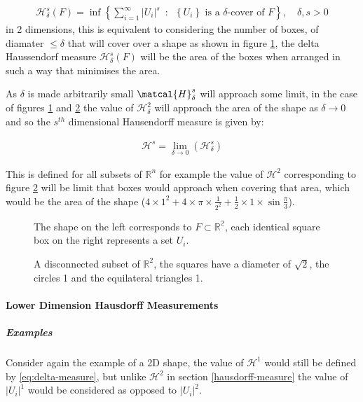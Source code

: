 \documentclass[11pt]{article}
\begin{document}
\begin{align}
\mathcal{H}^s_{\delta}\left( F \right)= \inf \left\{ \sum^{\infty}_{i= 1}   \left\lvert U_i \right\rvert^s \enspace : \enspace  \left\{U_i\right\} \text{ is a } \delta \text{-cover of } F \right\}, \quad \delta, s > 0 \label{eq:delta-measure}
\end{align}
in 2 dimensions, this is equivalent to considering the number of boxes, of
diamater \(\leq \delta\) that will cover over a shape as shown in figure
\ref{hausdorff-covering}, the delta Haussendorf measure
\(\mathcal{H}^{s}_{\delta} \left(F\right)\) will be the area of the boxes when
arranged in such a way that minimises the area.

As \(\delta\) is made arbitrarily small \(\matcal{H}_{\delta}^{s}\) will approach some limit, in the case of figures \ref{hausdorff-covering}  and \ref{abstract-shape} the value of \(\mathcal{H}^{2}_{\delta}\) will approach the area of the shape as \(\delta \rightarrow 0\) and so the \(s^{th}\) dimensional Hausendorff measure is given by:

\begin{align}
\mathcal{H}^{s} = \lim_{\delta \rightarrow 0}\left( \mathcal{H}^{s}_{\delta} \right)
\end{align}

This is defined for all subsets of \(\mathbb{R}^n\) for example the value of  \(\mathcal{H}^{2}\) corresponding to figure \ref{abstract-shape} will be limit that boxes would approach when covering that area, which would be the area of the shape (\(4\times 1^2 + 4\times \pi\times \frac{1}{2^2} + \frac{1}{2}\times 1 \times \sin{\frac{\pi}{3}}\)).



\begin{figure}[htbp]
\centering

\caption{\label{hausdorff-covering}The shape on the left corresponds to \(F \subset \mathbb{R^{2}}\), each identical square box on the right represents a set \(U_{i}\).}
\end{figure}


\begin{figure}[htbp]
\centering

\caption{\label{abstract-shape}A disconnected subset of \(\mathbb{R}^{2}\), the squares have a diameter of \(\sqrt{2}\), the circles 1 and the equilateral triangles 1.}
\end{figure}

\paragraph{Lower Dimension Hausdorff Measurements}
\label{sec:orga66b4dd}
\subparagraph{Examples}
\label{sec:orgfb17928}
Consider again the example of a 2D shape, the value of \(\mathcal{H}^{1}\) would still be defined by \eqref{eq:delta-measure}, but unlike \(\mathcal{H}^{2}\) in section \ref{hausdorff-measure} the value of \(\left\lvert U_i \right\rvert^1\) would be considered as opposed to \(\left\lvert U_i \right\rvert^2\).
\end{document}
